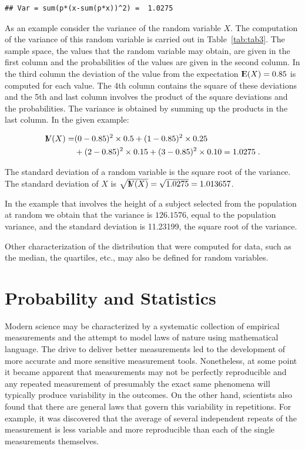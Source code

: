 \documentclass[]{krantz}
\newcommand{\Expec}{{\rm I\kern-.3em E}}
\newcommand{\Var}{{\rm I\kern-.3em V}}
\theoremstyle{definition}
\theoremstyle{definition}
\theoremstyle{definition}
\theoremstyle{remark}
\begin{document}
\begin{verbatim}
## Var = sum(p*(x-sum(p*x))^2) =  1.0275
\end{verbatim}

As an example consider the variance of the random variable \(X\). The
computation of the variance of this random variable is carried out in
Table~\ref{tab:tab3}. The sample space, the values that the
random variable may obtain, are given in the first column and the
probabilities of the values are given in the second column. In the third
column the deviation of the value from the expectation
\(\Expec(X) = 0.85\) is computed for each value. The 4th column contains
the square of these deviations and the 5th and last column involves the
product of the square deviations and the probabilities. The variance is
obtained by summing up the products in the last column. In the given
example:

\[\begin{aligned}
\Var(X) = & (0-0.85)^2 \times 0.5  + (1-0.85)^2 \times 0.25 \\ &+ (2-0.85)^2\times 0.15 + (3-0.85)^2\times 0.10= 1.0275\;.\end{aligned}\]

The standard deviation of a random variable is the square root of the
variance. The standard deviation of \(X\) is
\(\sqrt{\Var(X)} = \sqrt{1.0275} = 1.013657\).

In the example that involves the height of a subject selected from the
population at random we obtain that the variance is \(126.1576\), equal to
the population variance, and the standard deviation is 11.23199, the
square root of the variance.

Other characterization of the distribution that were computed for data,
such as the median, the quartiles, etc., may also be defined for random
variables.

\hypertarget{probability-and-statistics}{%
\section{Probability and Statistics}\label{probability-and-statistics}}

Modern science may be characterized by a systematic collection of
empirical measurements and the attempt to model laws of nature using
mathematical language. The drive to deliver better measurements led to
the development of more accurate and more sensitive measurement tools.
Nonetheless, at some point it became apparent that measurements may not
be perfectly reproducible and any repeated measurement of presumably the
exact same phenomena will typically produce variability in the outcomes.
On the other hand, scientists also found that there are general laws
that govern this variability in repetitions. For example, it was
discovered that the average of several independent repeats of the
measurement is less variable and more reproducible than each of the
single measurements themselves.
\end{document}

